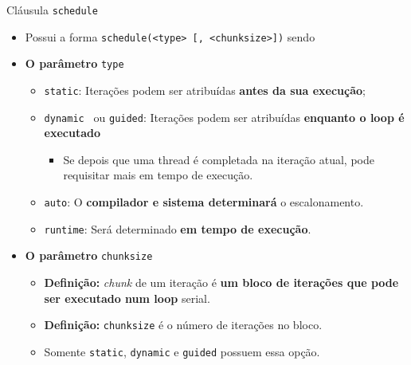	\begin{frame}{Cláusula {\tt schedule}}
		\begin{itemize}
			\setlength\itemsep{1em}
			\item Possui a forma {\tt schedule(<type> [, <chunksize>])} sendo
			\item \textbf{O parâmetro }{\tt type}
			\begin{itemize}
				\setlength\itemsep{0.4em}
				\item {\tt static}: Iterações podem ser atribuídas \textbf{antes da sua execução};
				\item {\tt dynamic } ou {\tt guided}: Iterações podem ser atribuídas \textbf{enquanto o loop é executado}
				\begin{itemize}
					\item Se depois que uma thread é completada na iteração atual, pode requisitar mais em tempo de execução.
				\end{itemize}

				\item {\tt auto}: O \textbf{compilador e sistema determinará} o escalonamento.
				\item {\tt runtime}: Será determinado \textbf{em tempo de execução}.
			\end{itemize}

			\item \textbf{O parâmetro} {\tt chunksize}
			\begin{itemize}
				\setlength\itemsep{0.4em}
				\item \textbf{Definição:} \textit{chunk} de um iteração é \textbf{um bloco de iterações que pode ser executado num loop} serial.
				\item \textbf{Definição:} {\tt chunksize} é o número de iterações no bloco.
				\item Somente {\tt static}, {\tt dynamic} e {\tt guided} possuem essa opção.
			\end{itemize}
		\end{itemize}
	\end{frame}

